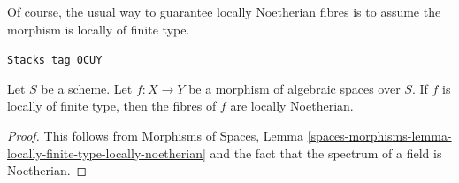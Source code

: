 Of course, the usual way to guarantee locally Noetherian fibres is
to assume the morphism is locally of finite type.

\begin{lemma}
\label{spaces-divisors-lemma-locally-finite-type-locally-Noetherian-fibres}
\href{https://stacks.math.columbia.edu/tag/0CUY}{\texttt{Stacks tag 0CUY}}

Let $S$ be a scheme. Let $f : X \to Y$ be a morphism of algebraic spaces
over $S$. If $f$ is locally of finite type, then
the fibres of $f$ are locally Noetherian.
\end{lemma}

\begin{proof}
This follows from Morphisms of Spaces, Lemma
\ref{spaces-morphisms-lemma-locally-finite-type-locally-noetherian}
and the fact that the spectrum of a field is Noetherian.
\end{proof}

